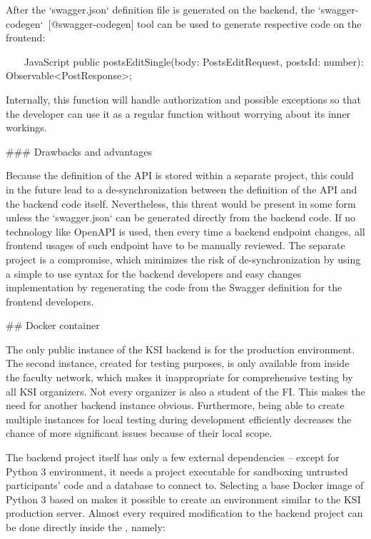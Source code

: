 \documentclass[
  digital, %
  oneside, %
  lof,     %
  nolot,     %
]{fithesis4}
\begin{document}
{After the `swagger.json` definition file is generated on the backend, the `swagger-codegen`~[@swagger-codegen] tool can be used to generate respective code on the frontend:

~~~ JavaScript
public postsEditSingle(body: PostsEditRequest, postsId: number): Observable<PostResponse>;
~~~

Internally, this function will handle authorization and possible exceptions so that the developer can use it as a regular function without worrying about its inner workings.

### Drawbacks and advantages

Because the definition of the \acrshort{API} is stored within a separate project, this could in the future lead to a de-synchronization between the definition of the \acrshort{API} and the backend code itself. Nevertheless, this threat would be present in some form unless the `swagger.json` can be generated directly from the backend code. If no technology like OpenAPI is used, then every time a backend endpoint changes, all frontend usages of such endpoint have to be manually reviewed. The separate project is a compromise, which minimizes the risk of de-synchronization by using a simple to use syntax for the backend developers and easy changes implementation by regenerating the code from the Swagger definition for the frontend developers.

## Docker container

The only public instance of the \acrshort{KSI} backend is for the production environment. The second instance, created for testing purposes, is only available from inside the faculty network, which makes it inappropriate for comprehensive testing by all \acrshort{KSI} organizers. Not every organizer is also a student of the \acrshort{FI}. This makes the need for another backend instance obvious. Furthermore, being able to create multiple instances for local testing during development efficiently decreases the chance of more significant issues because of their local scope.

The backend project itself has only a few external dependencies -- except for Python 3 environment, it needs a  project executable for sandboxing untrusted participants' code and a database to connect to. Selecting a base Docker image of Python 3 based on  makes it possible to create an environment similar to the \acrshort{KSI} production server. Almost every required modification to the backend project can be done directly inside the , namely:

}
\end{document}
